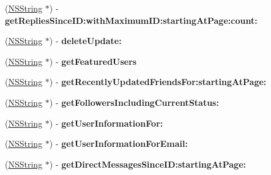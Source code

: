 \begin{DoxyCompactItemize}
\item 
\hypertarget{interface_m_g_twitter_engine_a2c707b99a30991a0ab0757e79fcc7192}{
(\hyperlink{class_n_s_string}{\-N\-S\-String} $\ast$) -\/ {\bfseries get\-Replies\-Since\-I\-D\-:with\-Maximum\-I\-D\-:starting\-At\-Page\-:count\-:}}
\label{interface_m_g_twitter_engine_a2c707b99a30991a0ab0757e79fcc7192}

\item 
\hypertarget{interface_m_g_twitter_engine_af3ce91314c877fff26c166f2e807697d}{
(\hyperlink{class_n_s_string}{\-N\-S\-String} $\ast$) -\/ {\bfseries delete\-Update\-:}}
\label{interface_m_g_twitter_engine_af3ce91314c877fff26c166f2e807697d}

\item 
\hypertarget{interface_m_g_twitter_engine_ae2ab1bbd18e796c760872ee397a75f34}{
(\hyperlink{class_n_s_string}{\-N\-S\-String} $\ast$) -\/ {\bfseries get\-Featured\-Users}}
\label{interface_m_g_twitter_engine_ae2ab1bbd18e796c760872ee397a75f34}

\item 
\hypertarget{interface_m_g_twitter_engine_a3f2e3bf40f1dcad75692d514858d2150}{
(\hyperlink{class_n_s_string}{\-N\-S\-String} $\ast$) -\/ {\bfseries get\-Recently\-Updated\-Friends\-For\-:starting\-At\-Page\-:}}
\label{interface_m_g_twitter_engine_a3f2e3bf40f1dcad75692d514858d2150}

\item 
\hypertarget{interface_m_g_twitter_engine_a4979c32666cd336144161e39bcd0ab64}{
(\hyperlink{class_n_s_string}{\-N\-S\-String} $\ast$) -\/ {\bfseries get\-Followers\-Including\-Current\-Status\-:}}
\label{interface_m_g_twitter_engine_a4979c32666cd336144161e39bcd0ab64}

\item 
\hypertarget{interface_m_g_twitter_engine_a5deec57286dc7d6ad98424ee2d8ae849}{
(\hyperlink{class_n_s_string}{\-N\-S\-String} $\ast$) -\/ {\bfseries get\-User\-Information\-For\-:}}
\label{interface_m_g_twitter_engine_a5deec57286dc7d6ad98424ee2d8ae849}

\item 
\hypertarget{interface_m_g_twitter_engine_a0846bbf1ad1664a885fe9015d7243735}{
(\hyperlink{class_n_s_string}{\-N\-S\-String} $\ast$) -\/ {\bfseries get\-User\-Information\-For\-Email\-:}}
\label{interface_m_g_twitter_engine_a0846bbf1ad1664a885fe9015d7243735}

\item 
\hypertarget{interface_m_g_twitter_engine_aaf576a2b307d113b22922bf8f10dfb7e}{
(\hyperlink{class_n_s_string}{\-N\-S\-String} $\ast$) -\/ {\bfseries get\-Direct\-Messages\-Since\-I\-D\-:starting\-At\-Page\-:}}
\label{interface_m_g_twitter_engine_aaf576a2b307d113b22922bf8f10dfb7e}


\end{DoxyCompactItemize}
